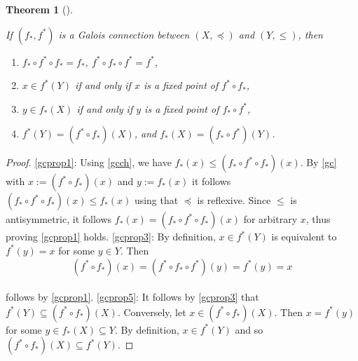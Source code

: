 \documentclass[
  letterpaper,
  10pt,
  reqno,
  twopage,
  openany]{book}
\providecommand{\tightlist}{%
  \setlength{\itemsep}{0pt}\setlength{\parskip}{0pt}}\usepackage{longtable,booktabs,array}
\theoremstyle{plain}
\theoremstyle{definition}
\theoremstyle{definition}
\theoremstyle{definition}
\theoremstyle{plain}
\theoremstyle{plain}
\newtheorem{theorem}{Theorem}[chapter]
\theoremstyle{remark}
\begin{document}
\leavevmode{}%
\begin{theorem}[]\label{thm-gcprop}

If \((f_*, f^*)\) is a Galois connection between \((X,\preceq)\) and
\((Y,\leqslant)\), then

\begin{enumerate}
\def\labelenumi{\arabic{enumi}.}
\tightlist
\item
  \(f_*\circ f^* \circ f_*=f_*\), \(f^*\circ f_* \circ f^*=f^*\),
\item
  \(x\in f^*(Y)\) if and only if \(x\) is a fixed point of
  \(f^*\circ f_*\),
\item
  \(y\in f_*(X)\) if and only if \(y\) is a fixed point of
  \(f_*\circ f^*\),
\item
  \(f^*(Y)=(f^*\circ f_*)(X)\), and \(f_*(X)=(f_*\circ f^*)(Y)\).
\end{enumerate}

\end{theorem}

\begin{proof}

\eqref{gcprop1}: Using \ref{gcch}, we have
\(f_*(x)\leqslant (f_*\circ f^*\circ f_*)(x)\). By \eqref{gc} with
\(x:=(f^*\circ f_*)(x)\) and \(y:=f_*(x)\) it follows
\((f_*\circ f^* \circ f_*)(x)\leqslant f_*(x)\) using that \(\preceq\)
is reflexive. Since \(\leqslant\) is antisymmetric, it follows
\(f_*(x)=(f_*\circ f^*\circ f_*)(x)\) for arbitrary \(x\), thus proving
\eqref{gcprop1} holds. \eqref{gcprop3}: By definition, \(x\in f^*(Y)\)
is equivalent to \(f^*(y)=x\) for some \(y\in Y\). Then \[
(f^*\circ f_*)(x)=(f^*\circ f_* \circ f^*)(y)=f^*(y)=x
\]\\
follows by \eqref{gcprop1}. \eqref{gcprop5}: It follows by
\eqref{gcprop3} that \(f^*(Y)\subseteq (f^*\circ f_*)(X)\). Conversely,
let \(x\in (f^*\circ f_*)(X)\). Then \(x=f^*(y)\) for some
\(y\in f_*(X)\subseteq Y\). By definition, \(x\in f^*(Y)\) and so
\((f^*\circ f_*)(X)\subseteq f^*(Y)\).

\end{proof}
\end{document}
